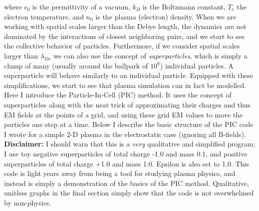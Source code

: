 \documentclass{article}
\begin{document}
where $\epsilon_0$ is the permittivity of a vacuum, $k_B$ is the Boltzmann constant, $T_e$ the electron temperature, and $n_0$ is the plasma (electron) density. \newline
When we are working with spatial scales larger than the Debye length, the dynamics are not dominated by the interactions of closest neighboring pairs, and we start to see the collective behavior of particles. 
\newline
\indent Furthermore, if we consider spatial scales larger than $\lambda_{De}$ we can also use the concept of \textit{superparticles}, which is simply a clump of many (usually around the ballpark of $10^6$) individual particles. A superparticle will behave similarly to an individual particle. \newline
\newline
\newline 
\indent Equipped with these simplifications, we start to see that plasma simulation can in fact be modelled. Here I introduce the Particle-In-Cell (PIC) method. It uses the concept of superparticles along with the neat trick of approximating their charges and thus EM fields at the points of a grid, and using these grid EM values to move the particles one step at a time. Below I describe the basic structure of the PIC code I wrote for a simple 2-D plasma in the electrostatic case (ignoring all B-fields).\newline \newline
\textbf{Disclaimer:} I should warn that this is a \textit{very} qualitative and simplified program; I use toy negative superparticles of total charge -1.0 and mass 0.1, and positive superparticles of total charge +1.0 and mass 1.0. Epsilon is also set to 1.0. This code is light years away from being a tool for studying plasma physics, and instead is simply a demonstration of the basics of the PIC method. Qualitative, unitless graphs in the final section simply show that the code is not overwhelmed by non-physics. \newline
\newline
\end{document}
